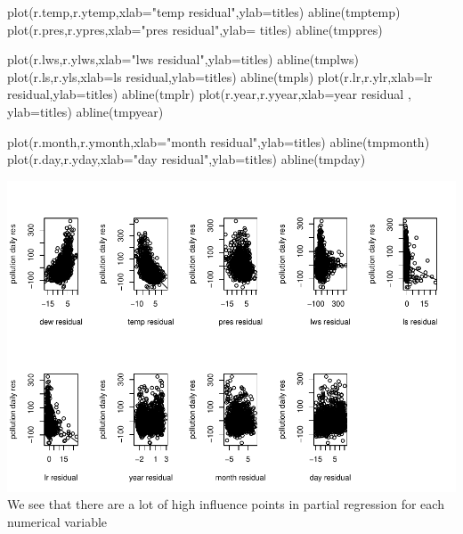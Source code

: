 \documentclass[
]{article}
\newenvironment{Shaded}{\begin{snugshade}}{\end{snugshade}}
\newcommand{\AttributeTok}[1]{\textcolor[rgb]{0.77,0.63,0.00}{#1}}
\newcommand{\FunctionTok}[1]{\textcolor[rgb]{0.00,0.00,0.00}{#1}}
\newcommand{\NormalTok}[1]{#1}
\newcommand{\StringTok}[1]{\textcolor[rgb]{0.31,0.60,0.02}{#1}}
\begin{document}
\begin{Shaded}
\begin{Highlighting}[]
\FunctionTok{plot}\NormalTok{(r.temp,r.ytemp,}\AttributeTok{xlab=}\StringTok{"temp residual"}\NormalTok{,}\AttributeTok{ylab=}\NormalTok{titles)}
\FunctionTok{abline}\NormalTok{(tmptemp)}
\FunctionTok{plot}\NormalTok{(r.pres,r.ypres,}\AttributeTok{xlab=}\StringTok{"pres residual"}\NormalTok{,}\AttributeTok{ylab=}\NormalTok{ titles)}
\FunctionTok{abline}\NormalTok{(tmppres)}

\FunctionTok{plot}\NormalTok{(r.lws,r.ylws,}\AttributeTok{xlab=}\StringTok{"lws residual"}\NormalTok{,}\AttributeTok{ylab=}\NormalTok{titles)}
\FunctionTok{abline}\NormalTok{(tmplws)}
\FunctionTok{plot}\NormalTok{(r.ls,r.yls,}\AttributeTok{xlab=}\StringTok{\textquotesingle{}ls residual\textquotesingle{}}\NormalTok{,}\AttributeTok{ylab=}\NormalTok{titles)}
\FunctionTok{abline}\NormalTok{(tmpls)}
\FunctionTok{plot}\NormalTok{(r.lr,r.ylr,}\AttributeTok{xlab=}\StringTok{\textquotesingle{}lr residual\textquotesingle{}}\NormalTok{,}\AttributeTok{ylab=}\NormalTok{titles)}
\FunctionTok{abline}\NormalTok{(tmplr)}
\FunctionTok{plot}\NormalTok{(r.year,r.yyear,}\AttributeTok{xlab=}\StringTok{\textquotesingle{}year residual\textquotesingle{}}\NormalTok{ , }\AttributeTok{ylab=}\NormalTok{titles)}
\FunctionTok{abline}\NormalTok{(tmpyear)}

\FunctionTok{plot}\NormalTok{(r.month,r.ymonth,}\AttributeTok{xlab=}\StringTok{"month residual"}\NormalTok{,}\AttributeTok{ylab=}\NormalTok{titles)}
\FunctionTok{abline}\NormalTok{(tmpmonth)}
\FunctionTok{plot}\NormalTok{(r.day,r.yday,}\AttributeTok{xlab=}\StringTok{"day residual"}\NormalTok{,}\AttributeTok{ylab=}\NormalTok{titles)}
\FunctionTok{abline}\NormalTok{(tmpday)}
\end{Highlighting}
\end{Shaded}

\includegraphics{Final_Project_2_files/figure-latex/unnamed-chunk-9-1.pdf}
We see that there are a lot of high influence points in partial
regression for each numerical variable
\end{document}
